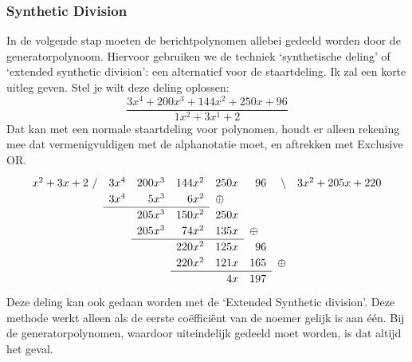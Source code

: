 \documentclass{article}
\begin{document}
\subsubsection{Synthetic Division}
In de volgende stap moeten de berichtpolynomen allebei gedeeld worden door de generatorpolynoom. Hiervoor gebruiken we de techniek `synthetische deling' of `extended synthetic division': een alternatief voor de staartdeling. Ik zal een korte uitleg geven. Stel je wilt deze deling oplossen:
$$\frac{
3x^4+200x^3+144x^2+250x+96
}{
1x^2 + 3x^1 + 2
}$$
Dat kan met een normale staartdeling voor polynomen, houdt er alleen rekening mee dat vermenigvuldigen met de alphanotatie moet, en aftrekken met Exclusive OR.
\[
\renewcommand\arraystretch{1.2}
\begin{array}{rrrrrrrr}
x^2+3x+2\text{ /} & 3x^4 & 200x^3 & 144x^2 & 250x & 96 & \text{\textbackslash} & 3x^2+205x+220\\
&3x^4 & 5x^3 & 6x^2 & \multicolumn{1}{l}{\xor}\\\cline{2-4}
&&205x^3 & 150x^2 & 250x\\
&&205x^3 & 74x^2 & 135x & \multicolumn{1}{l}{\xor} \\\cline{3-5}
&&&220x^2 & 125x & 96\\
&&&220x^2 & 121x & 165 & \multicolumn{1}{l}{\xor} \\\cline{4-6}
&&&&4x & 197
\end{array}
\]
Deze deling kan ook gedaan worden met de `Extended Synthetic division'. Deze methode werkt alleen als de eerste coëfficiënt van de noemer gelijk is aan één. Bij de generatorpolynomen, waardoor uiteindelijk gedeeld moet worden, is dat altijd het geval.
\end{document}
